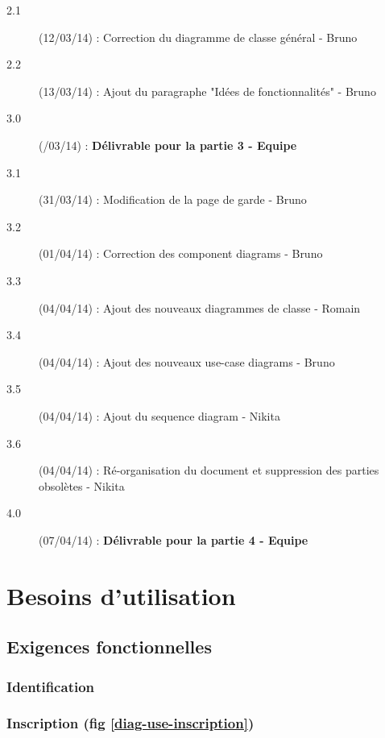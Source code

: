 \documentclass[a4paper]{report}
\begin{document}
\begin{description}
    \item[2.1] (12/03/14) : Correction du diagramme de classe général - Bruno
    \item[2.2] (13/03/14) : Ajout du paragraphe "Idées de fonctionnalités" - Bruno
    \item[3.0] (/03/14) : \textbf{Délivrable pour la partie 3 - Equipe}
    
    \item[3.1] (31/03/14) : Modification de la page de garde - Bruno
    \item[3.2] (01/04/14) : Correction des component diagrams - Bruno
    \item[3.3] (04/04/14) : Ajout des nouveaux diagrammes de classe - Romain
    \item[3.4] (04/04/14) : Ajout des nouveaux use-case diagrams - Bruno
    \item[3.5] (04/04/14) : Ajout du sequence diagram - Nikita
    \item[3.6] (04/04/14) : Ré-organisation du document et suppression des parties obsolètes - Nikita
    
    \item[4.0] (07/04/14) : \textbf{Délivrable pour la partie 4 - Equipe}
    


\end{description}


\chapter{Besoins d'utilisation}
\section{Exigences fonctionnelles}

\subsection{Identification}

\subsection{Inscription (fig \ref{diag-use-inscription})}

\end{document}

